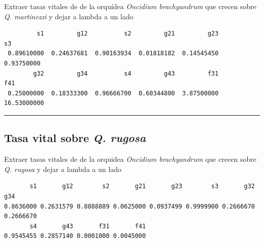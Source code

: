 \documentclass[
  12pt,
  letterpaper,
]{book}
\newenvironment{Shaded}{\begin{snugshade}}{\end{snugshade}}
\newcommand{\CommentTok}[1]{\textcolor[rgb]{0.37,0.37,0.37}{#1}}
\newcommand{\DecValTok}[1]{\textcolor[rgb]{0.68,0.00,0.00}{#1}}
\newcommand{\FunctionTok}[1]{\textcolor[rgb]{0.28,0.35,0.67}{#1}}
\newcommand{\NormalTok}[1]{\textcolor[rgb]{0.00,0.23,0.31}{#1}}
\newcommand{\OtherTok}[1]{\textcolor[rgb]{0.00,0.23,0.31}{#1}}
\newcommand{\SpecialCharTok}[1]{\textcolor[rgb]{0.37,0.37,0.37}{#1}}
\begin{document}
Extraer tasas vitales de de la orquídea \emph{Oncidium brachyandrum} que
crecen sobre \emph{Q. martinezzi} y dejar a lambda a un lado

\begin{Shaded}
\end{Shaded}

\begin{verbatim}
         s1         g12          s2         g21         g23          s3 
 0.89610000  0.24637681  0.90163934  0.01818182  0.14545450  0.93750000 
        g32         g34          s4         g43         f31         f41 
 0.25000000  0.18333300  0.96666700  0.60344800  3.87500000 16.53000000 
\end{verbatim}

\begin{center}\rule{0.5\linewidth}{0.5pt}\end{center}

\subsection{\texorpdfstring{Tasa vital sobre \emph{Q.
rugosa}}{Tasa vital sobre Q. rugosa}}\label{tasa-vital-sobre-q.-rugosa}

Extraer tasas vitales de de la orquidea \emph{Oncidium brachyandrum} que
crecen sobre \emph{Q. rugosa} y dejar a lambda a un lado

\begin{Shaded}
\end{Shaded}

\begin{verbatim}
       s1       g12        s2       g21       g23        s3       g32       g34 
0.8636000 0.2631579 0.8888889 0.0625000 0.0937499 0.9999900 0.2666670 0.2666670 
       s4       g43       f31       f41 
0.9545455 0.2857140 0.0001000 0.0045000 
\end{verbatim}
\end{document}
